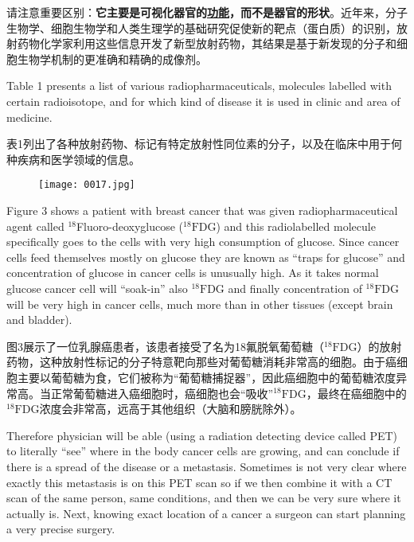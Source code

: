 \documentclass[dvipsnames, svgnames,a4paper,11pt]{article}
\begin{document}
请注意重要区别：\textbf{它主要是可视化器官的\underline{功能}，而不是器官的形状}。近年来，分子生物学、细胞生物学和人类生理学的基础研究促使新的靶点（蛋白质）的识别，放射药物化学家利用这些信息开发了新型放射药物，其结果是基于新发现的分子和细胞生物学机制的更准确和精确的成像剂。

Table 1 presents a list of various radiopharmaceuticals, molecules labelled with certain radioisotope, and for which kind of disease it is used in clinic and area of medicine.

表1列出了各种放射药物、标记有特定放射性同位素的分子，以及在临床中用于何种疾病和医学领域的信息。
\begin{figure}[htbp]
      \centering
      \texttt{[image: 0017.jpg]}
 \label{fig3}
  \end{figure}

Figure 3 shows a patient with breast cancer that was given radiopharmaceutical agent called ${}^{18}$Fluoro-deoxyglucose (${}^{18}\text{F}$DG) and this radiolabelled molecule specifically goes to the cells with very high consumption of glucose. Since cancer cells feed themselves mostly on glucose they are known as “traps for glucose” and concentration of glucose in cancer cells is unusually high. As it takes normal glucose cancer cell will “soak-in” also ${}^{18}\text{F}$DG and finally concentration of ${}^{18}\text{F}$DG will be very high in cancer cells, much more than in other tissues (except brain and bladder).

图3展示了一位乳腺癌患者，该患者接受了名为18氟脱氧葡萄糖（${}^{18}\text{F}$DG）的放射药物，这种放射性标记的分子特意靶向那些对葡萄糖消耗非常高的细胞。由于癌细胞主要以葡萄糖为食，它们被称为“葡萄糖捕捉器”，因此癌细胞中的葡萄糖浓度异常高。当正常葡萄糖进入癌细胞时，癌细胞也会“吸收”${}^{18}\text{F}$DG，最终在癌细胞中的${}^{18}\text{F}$DG浓度会非常高，远高于其他组织（大脑和膀胱除外）。

Therefore physician will be able (using a radiation detecting device called PET) to literally “see” where in the body cancer cells are growing, and can conclude if there is a spread of the disease or a metastasis. Sometimes is not very clear where exactly this metastasis is on this PET scan so if we then combine it with a CT scan of the same person, same conditions, and then we can be very sure where it actually is. Next, knowing exact location of a cancer a surgeon can start planning a very precise surgery.
\end{document}
